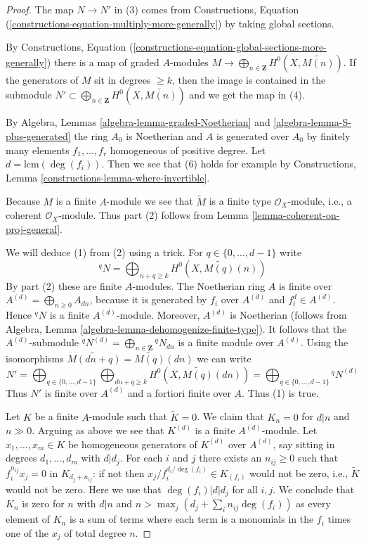 \documentclass{stacks-project}
\theoremstyle{plain}
\theoremstyle{definition}
\theoremstyle{remark}
\numberwithin{equation}{subsection}
\begin{document}
\begin{proof}
The map $N \to N'$ in (3) comes from
Constructions, Equation (\ref{constructions-equation-multiply-more-generally})
by taking global sections.

\medskip\noindent
By
Constructions, Equation
(\ref{constructions-equation-global-sections-more-generally})
there is a map of graded $A$-modules
$M \to \bigoplus_{n \in \mathbf{Z}} H^0(X, \widetilde{M(n)})$.
If the generators of $M$ sit in degrees $\geq k$, then the image
is contained in the submodule
$N' \subset \bigoplus_{n \in \mathbf{Z}} H^0(X, \widetilde{M(n)})$
and we get the map in (4).

\medskip\noindent
By Algebra, Lemmas \ref{algebra-lemma-graded-Noetherian} and
\ref{algebra-lemma-S-plus-generated} the ring $A_0$ is Noetherian
and $A$ is generated over $A_0$ by finitely many elements
$f_1, \ldots, f_r$ homogeneous of positive degree.
Let $d = \text{lcm}(\deg(f_i))$. Then we see that (6) holds
for example by
Constructions, Lemma \ref{constructions-lemma-where-invertible}.

\medskip\noindent
Because $M$ is a finite $A$-module we see that
$\widetilde{M}$ is a finite type $\mathcal{O}_X$-module,
i.e., a coherent $\mathcal{O}_X$-module.
Thus part (2) follows from Lemma \ref{lemma-coherent-on-proj-general}.

\medskip\noindent
We will deduce (1) from (2) using a trick. For $q \in \{0, \ldots, d - 1\}$
write
$$
{}^qN = \bigoplus\nolimits_{n + q \geq k} H^0(X, \widetilde{M(q)}(n))
$$
By part (2) these are finite $A$-modules. The Noetherian ring $A$
is finite over $A^{(d)} = \bigoplus_{n \geq 0} A_{dn}$, because
it is generated by $f_i$ over $A^{(d)}$ and $f_i^d \in A^{(d)}$.
Hence ${}^qN$ is a finite $A^{(d)}$-module.
Moreover, $A^{(d)}$ is Noetherian (follows from
Algebra, Lemma \ref{algebra-lemma-dehomogenize-finite-type}).
It follows that the $A^{(d)}$-submodule
${}^qN^{(d)} = \bigoplus_{n \in \mathbf{Z}} {}^qN_{dn}$
is a finite module over $A^{(d)}$. Using the isomorphisms
$\widetilde{M(dn + q)} = \widetilde{M(q)}(dn)$ we can write
$$
N' =
\bigoplus\nolimits_{q \in \{0, \ldots, d - 1\}}
\bigoplus\nolimits_{dn + q \geq k}
H^0(X, \widetilde{M(q)}(dn)) =
\bigoplus\nolimits_{q \in \{0, \ldots, d - 1\}} {}^qN^{(d)}
$$
Thus $N'$ is finite over $A^{(d)}$ and a fortiori finite over $A$.
Thus (1) is true.

\medskip\noindent
Let $K$ be a finite $A$-module such that $\widetilde{K} = 0$. We claim
that $K_n = 0$ for $d|n$ and $n \gg 0$. Arguing as above we see that
$K^{(d)}$ is a finite $A^{(d)}$-module. Let
$x_1, \ldots, x_m \in K$ be homogeneous generators of $K^{(d)}$
over $A^{(d)}$, say sitting in degrees $d_1, \ldots, d_m$ with $d | d_j$.
For each $i$ and $j$ there exists an $n_{ij} \geq 0$ such that
$f_i^{n_{ij}} x_j = 0$ in $K_{d_j + n_{ij}}$: if not then
$x_j/f_i^{d_i/\deg(f_i)} \in K_{(f_i)}$ would not be zero, i.e.,
$\widetilde{K}$ would not be zero. Here we use that $\deg(f_i) | d | d_j$
for all $i, j$. We conclude that $K_n$ is zero for
$n$ with $d | n$ and $n > \max_j (d_j + \sum_i n_{ij} \deg(f_i))$
as every element of $K_n$ is a sum of terms where each term is a
monomials in the $f_i$ times one of the $x_j$ of total degree $n$.


\end{proof}
\end{document}
